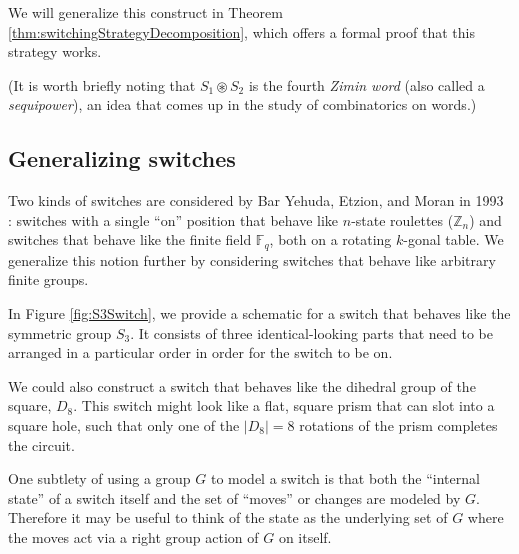 We will generalize this construct in
Theorem \ref{thm:switchingStrategyDecomposition},
which offers a formal proof that this strategy works.

(It is worth briefly noting that $S_1 \circledast S_2$ is the fourth
\textit{Zimin word} (also called a \textit{sequipower}),
an idea that comes up in the study of combinatorics on words.)

\subsection{Generalizing switches}
\label{sec:GeneralizingSwitches}
Two kinds of switches are considered by Bar Yehuda, Etzion, and Moran in 1993
\cite{BarYehuda1993}: switches with a single ``on'' position that behave like
$n$-state roulettes ($\mathbb Z_n$) and switches that behave like
the finite field $\mathbb F_q$, both on a rotating $k$-gonal table.
We generalize this notion further by considering switches that behave like
arbitrary finite groups.

\begin{example}
In Figure \ref{fig:S3Switch}, we provide a schematic for a switch that behaves
like the symmetric group $S_3$.
It consists of three identical-looking parts that need to be
arranged in a particular order in order for the switch to be on.

We could also construct a switch that behaves like the dihedral group of the
square, $D_8$.
This switch might look like a flat, square prism that can slot into a square hole,
such that only one of the $|D_8| = 8$ rotations of the prism completes the circuit.
\label{ex:S3D8Schematics}
\end{example}



\begin{note}
  One subtlety of using a group $G$ to model a switch is that
  both the ``internal state'' of a switch itself and
  the set of ``moves'' or changes are modeled by $G$.
  Therefore it may be useful to think of the state as the underlying set of $G$
  where the moves act via a right group action of $G$ on itself.
\end{note}

